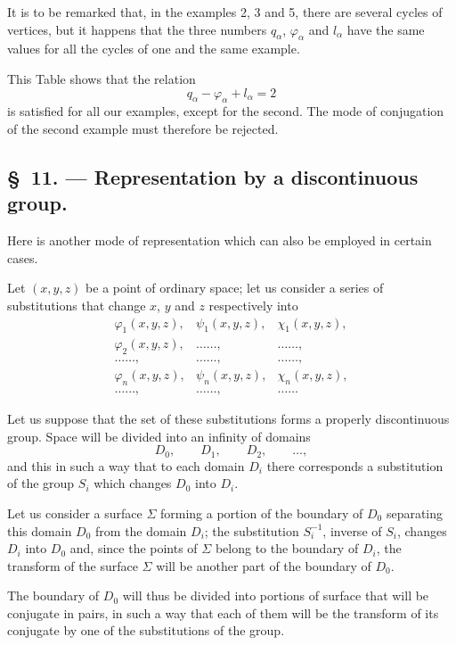 \documentclass{article}
\begin{document}
It is to be remarked that, in the examples 2, 3 and 5, there are several cycles of vertices, but it happens that the three numbers $q_{\alpha}$, $\varphi_{\alpha}$ and $l_{\alpha}$ have the same values for all the cycles of one and the same example.

This Table shows that the relation
\[ q_{\alpha} - \varphi_{\alpha} + l_{\alpha} = 2 \]
is satisfied for all our examples, except for the second. The mode of conjugation of the second example must therefore be rejected.

\subsection*{\S~11. --- Representation by a discontinuous group.}

Here is another mode of representation which can also be employed in certain cases.

Let $(x, y, z)$ be a point of ordinary space; let us consider a series of substitutions that change $x$, $y$ and $z$ respectively into
\[ \begin{matrix} \varphi_{1}(x, y, z), & \psi_{1}(x, y, z), & \chi_{1}(x, y, z), \\[1ex] \varphi_{2}(x, y, z), & \ldots\ldots, & \ldots\ldots, \\[1ex] \ldots\ldots, & \ldots\ldots, & \ldots\ldots, \\[1ex] \varphi_{n}(x, y, z), & \psi_{n}(x, y, z), & \chi_{n}(x, y, z), \\[1ex] \ldots\ldots, & \ldots\ldots, & \ldots\ldots \end{matrix} \]

Let us suppose that the set of these substitutions forms a properly discontinuous group. Space will be divided into an infinity of domains
\[ D_{0}, \qquad D_{1}, \qquad D_{2}, \qquad \ldots, \]
and this in such a way that to each domain $D_{i}$ there corresponds a substitution of the group $S_{i}$ which changes $D_{0}$ into $D_{i}$.

Let us consider a surface $\Sigma$ forming a portion of the boundary of $D_{0}$ separating this domain $D_{0}$ from the domain $D_{i}$; the substitution $S^{-1}_{i}$, inverse of $S_{i}$, changes $D_{i}$ into $D_{0}$ and, since the points of $\Sigma$ belong to the boundary of $D_{i}$, the transform of the surface $\Sigma$ will be another part of the boundary of $D_{0}$.

The boundary of $D_{0}$ will thus be divided into portions of surface that will be conjugate in pairs, in such a way that each of them will be the transform of its conjugate by one of the substitutions of the group.
\end{document}
